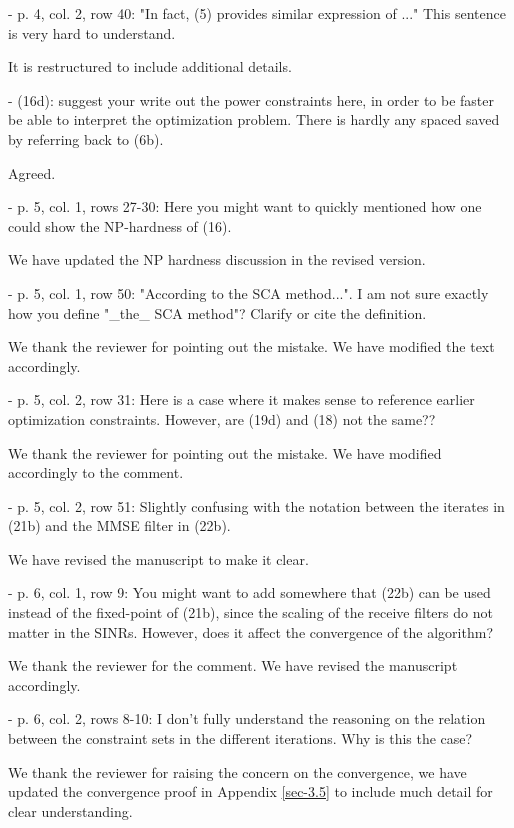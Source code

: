  - p. 4, col. 2, row 40: "In fact, (5) provides similar expression of ..." This sentence is very hard to understand.

\resp It is restructured to include additional details.

 - (16d): suggest your write out the power constraints here, in order to be faster be able to interpret the optimization problem. There is hardly any spaced saved by referring back to (6b).

\resp Agreed.

 - p. 5, col. 1, rows 27-30: Here you might want to quickly mentioned how one could show the NP-hardness of (16).

\resp We have updated the NP hardness discussion in the revised version.

 - p. 5, col. 1, row 50: "According to the SCA method...". I am not sure exactly how you define "\_the\_ SCA method"? Clarify or cite the definition.

\resp We thank the reviewer for pointing out the mistake. We have modified the text accordingly.

 - p. 5, col. 2, row 31: Here is a case where it makes sense to reference earlier optimization constraints. However, are (19d) and (18) not the same??

\resp We thank the reviewer for pointing out the mistake. We have modified accordingly to the comment.

 - p. 5, col. 2, row 51: Slightly confusing with the notation between the iterates in (21b) and the MMSE filter in (22b).

\resp We have revised the manuscript to make it clear.

 - p. 6, col. 1, row 9: You might want to add somewhere that (22b) can be used instead of the fixed-point of (21b), since the scaling of the receive filters do not matter in the SINRs. However, does it affect the convergence of the algorithm?

\resp We thank the reviewer for the comment. We have revised the manuscript accordingly.

 - p. 6, col. 2, rows 8-10: I don't fully understand the reasoning on the relation between the constraint sets in the different iterations. Why is this the case?

\resp We thank the reviewer for raising the concern on the convergence, we have updated the convergence proof in Appendix \ref{sec-3.5} to include much detail for clear understanding.


